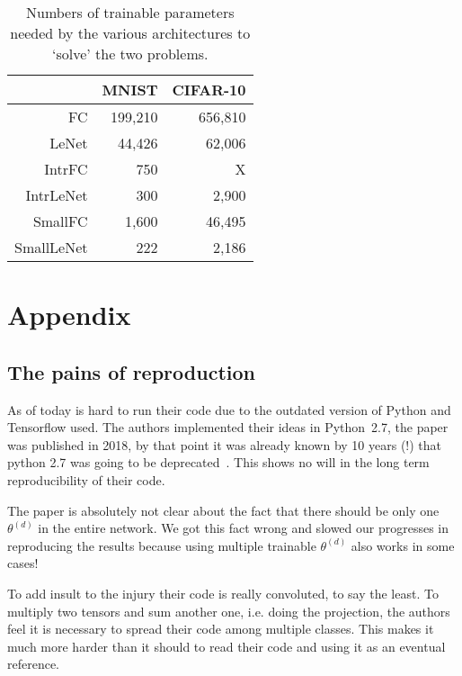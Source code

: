 \documentclass[twocolumn]{article}
\begin{document}
\begin{table}
	\centering
	\begin{tabular}{r|r|r|}
	\cline{2-3}
	                                 & MNIST   & CIFAR-10 \\
	\hline
	\multicolumn{1}{|r|}{FC}         & 199,210 & 656,810 \\
	\multicolumn{1}{|r|}{LeNet}      & 44,426  & 62,006  \\
	\multicolumn{1}{|r|}{IntrFC}     & 750     & X       \\
	\multicolumn{1}{|r|}{IntrLeNet}  & 300     & 2,900   \\
	\multicolumn{1}{|r|}{SmallFC}    & 1,600   & 46,495  \\
	\multicolumn{1}{|r|}{SmallLeNet} & 222     & 2,186   \\
	\hline
	\end{tabular}
	\caption{Numbers of trainable parameters needed by the various architectures
	to `solve' the two problems.}
	\label{tab:params}
\end{table}

\clearpage

\appendix

\section{Appendix}

\subsection{The pains of reproduction}\label{app:troubles}
As of today is hard to run their code due to the outdated version of Python and
Tensorflow used.  The authors implemented their ideas in Python~2.7, the paper
was published in 2018, by that point it was already known by 10 years (!) that
python 2.7 was going to be deprecated~\cite{python}. This shows no will in the
long term reproducibility of their code.

The paper is absolutely not clear about the fact that there should be only one
$\theta^{(d)}$ in the entire network. We got this fact wrong and slowed our
progresses in reproducing the results because using multiple trainable
$\theta^{(d)}$ also works in some cases!

To add insult to the injury their code is really convoluted, to say the least.
To multiply two tensors and sum another one, i.e. doing the projection, the
authors feel it is necessary to spread their code among multiple classes. This
makes it much more harder than it should to read their code and using it as an
eventual reference.



\end{document}
